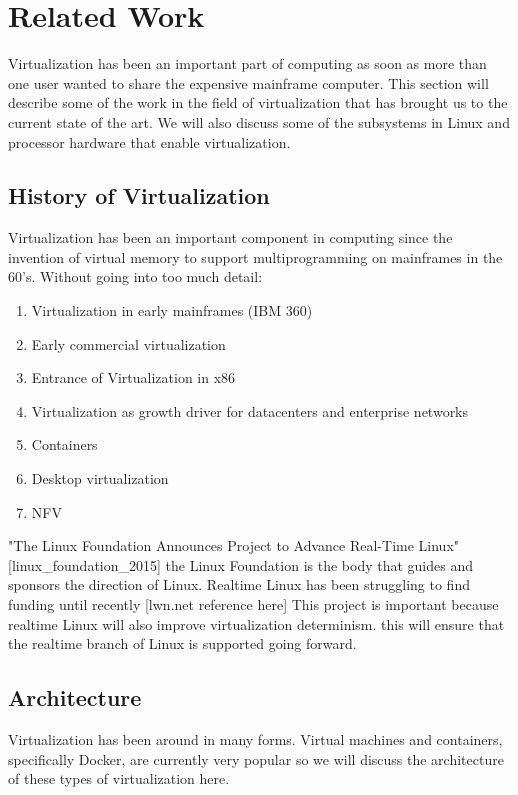 \glsresetall
\chapter{Related Work}
\label{sec:related_work}
Virtualization has been an important part of computing as soon as more than one user wanted to share the 
expensive mainframe computer.  This section will describe some of the work in the field of 
virtualization that has brought us to the current state of the art.  We will also discuss some of the
subsystems in Linux and processor hardware that enable virtualization. 

\section{History of Virtualization}
\label{sec:history_vt}
Virtualization has been an important component in computing since the invention of virtual memory to support multiprogramming on mainframes in the 60's.  
Without going into too much detail:  
\begin{enumerate}
  \item Virtualization in early mainframes (IBM 360)
  \item Early commercial virtualization
  \item Entrance of Virtualization in x86
  \item Virtualization as growth driver for datacenters and enterprise networks
  \item Containers
  \item Desktop virtualization
  \item NFV
\end{enumerate}

"The Linux Foundation Announces Project to Advance Real-Time Linux"  [linux\_foundation\_2015]
	the Linux Foundation is the body that guides and sponsors the direction of Linux.  
	Realtime Linux has been struggling to find funding until recently [lwn.net reference here] 
	This project is important because realtime Linux will also improve virtualization determinism.
	this will ensure that the realtime branch of Linux is supported going forward.  


\section{Architecture}
\label{sec:sys_arch}
Virtualization has been around in many forms.  Virtual machines and containers, specifically Docker, are currently 
very popular so we will discuss the architecture of these types of virtualization here.
